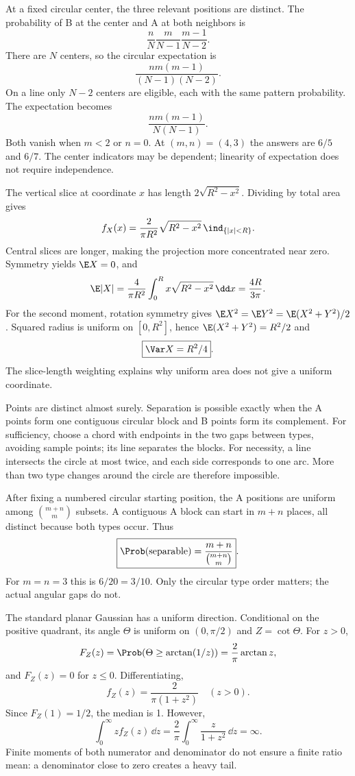 At a fixed circular center, the three relevant positions are distinct. The probability of B at the center and A at both neighbors is
\[
\frac nN\frac m{N-1}\frac{m-1}{N-2}.
\]
There are $N$ centers, so the circular expectation is
\[
\boxed{\frac{nm(m-1)}{(N-1)(N-2)}}.
\]
On a line only $N-2$ centers are eligible, each with the same pattern probability. The expectation becomes
\[
\boxed{\frac{nm(m-1)}{N(N-1)}}.
\]
Both vanish when $m<2$ or $n=0$. At $(m,n)=(4,3)$ the answers are $6/5$ and $6/7$. The center indicators may be dependent; linearity of expectation does not require independence.

The vertical slice at coordinate $x$ has length $2\sqrt{R^2-x^2}$. Dividing by total area gives
\[
f_X(x)=\frac{2}{\pi R^2}\sqrt{R^2-x^2}\,\ind_{\{|x|<R\}}.
\]
Central slices are longer, making the projection more concentrated near zero. Symmetry yields $\E X=0$, and
\[
\E|X|=\frac4{\pi R^2}\int_0^R x\sqrt{R^2-x^2}\,\dd x
=\frac{4R}{3\pi}.
\]
For the second moment, rotation symmetry gives $\E X^2=\E Y^2=\E(X^2+Y^2)/2$. Squared radius is uniform on $[0,R^2]$, hence $\E(X^2+Y^2)=R^2/2$ and
\[
\boxed{\Var X=R^2/4}.
\]
The slice-length weighting explains why uniform area does not give a uniform coordinate.

Points are distinct almost surely. Separation is possible exactly when the A points form one contiguous circular block and B points form its complement. For sufficiency, choose a chord with endpoints in the two gaps between types, avoiding sample points; its line separates the blocks. For necessity, a line intersects the circle at most twice, and each side corresponds to one arc. More than two type changes around the circle are therefore impossible.

After fixing a numbered circular starting position, the A positions are uniform among $\binom{m+n}{m}$ subsets. A contiguous A block can start in $m+n$ places, all distinct because both types occur. Thus
\[
\boxed{\Prob(\text{separable})=\frac{m+n}{\binom{m+n}{m}}}.
\]
For $m=n=3$ this is $6/20=3/10$. Only the circular type order matters; the actual angular gaps do not.

The standard planar Gaussian has a uniform direction. Conditional on the positive quadrant, its angle $\Theta$ is uniform on $(0,\pi/2)$ and $Z=\cot\Theta$. For $z>0$,
\[
F_Z(z)=\Prob(\Theta\ge\arctan(1/z))
=\frac2\pi\arctan z,
\]
and $F_Z(z)=0$ for $z\le0$. Differentiating,
\[
f_Z(z)=\frac2{\pi(1+z^2)}\quad(z>0).
\]
Since $F_Z(1)=1/2$, the median is 1. However,
\[
\int_0^\infty z f_Z(z)\,\dd z
=\frac2\pi\int_0^\infty\frac z{1+z^2}\,\dd z=\infty.
\]
Finite moments of both numerator and denominator do not ensure a finite ratio mean: a denominator close to zero creates a heavy tail.

